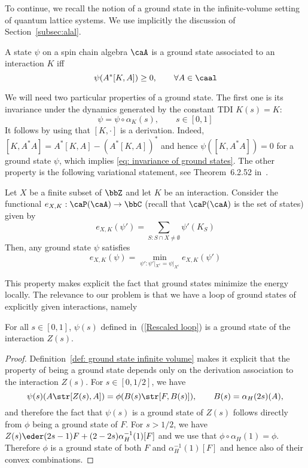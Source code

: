 To continue, we recall the notion of a ground state in the infinite-volume setting of quantum lattice systems. We use implicitly the discussion of Section~\ref{subsec:alal}.
\begin{definition}\label{def: ground state infinite volume}
	A state $\psi$ on a spin chain algebra $\caA$ is a ground state associated to an interaction $K$ iff\
	$$
	\psi(A^*[K,A]) \geq 0,\qquad \forall A \in \caal
	$$
\end{definition}
We will need two particular properties of a ground state. The first one is its invariance under the dynamics generated by the constant TDI $K(s)=K$:
\begin{equation}\label{eq: invariance of ground states}
\psi=\psi\circ\alpha_K(s), \qquad s\in [0,1]
\end{equation}
It follows by using that $[K,\cdot]$ is a derivation. Indeed, $[K,A^*A]=  A^*[K,A] - (A^*[K,A])^*$
and hence $\psi([K,A^*A])=0$ for a ground state $\psi$, which implies \eqref{eq: invariance of ground states}. The other property is the following variational statement, see Theorem~6.2.52 in~\cite{BratRob2}.
\begin{lemma}\label{lem: variational principle}
	Let $X$ be a finite subset of $\bbZ$ and let $K$ be an interaction. Consider the functional  $e_{X,K}:\caP(\caA)\to \bbC$ (recall that $\caP(\caA)$ is the set of states) given by
	$$e_{X,K}(\psi')= \sum_{S: S \cap X \neq \emptyset} \psi'(K_S)$$ 
	Then, any ground state $\psi$ satisfies
	$$
	e_{X,K}(\psi)=\min_{\psi':\psi'|_{X^c}=\psi|_{X^c} }  e_{X,K}(\psi')
	$$
\end{lemma}
This property makes explicit the fact that ground states minimize the energy locally. 
The relevance to our problem is that we have a loop of ground states of explicitly given  interactions, namely
\begin{lemma}
	For all $s\in[0,1]$,  $\psi(s)$ defined in~(\ref{Rescaled loop}) is a ground state of the interaction $Z(s)$. 
\end{lemma}
\begin{proof}
	Definition~\ref{def: ground state infinite volume} makes it explicit that the property of being a ground state depends only on the derivation association to the interaction $Z(s)$.  For  $s \in [0,1/2] $, we have $$\psi(s)(A\str[Z(s),A]) = \phi(B(s)\str[F,B(s)]),\qquad B(s) = \alpha_H(2s)(A),$$ and therefore the fact that $\psi(s)$ is a ground state of $Z(s)$ follows directly from $\phi$ being a ground state of $F$.  For $s>1/2$, we have $Z(s) \eder (2s-1)F+    (2-2s)\alpha^{-1}_H(1)[F]$ and we use that $\phi\circ\alpha_H(1)=\phi$. Therefore $\phi$ is a ground state of both $F$ and     $\alpha_H^{-1}(1)[F]$ and hence also of their convex combinations. 
\end{proof}

